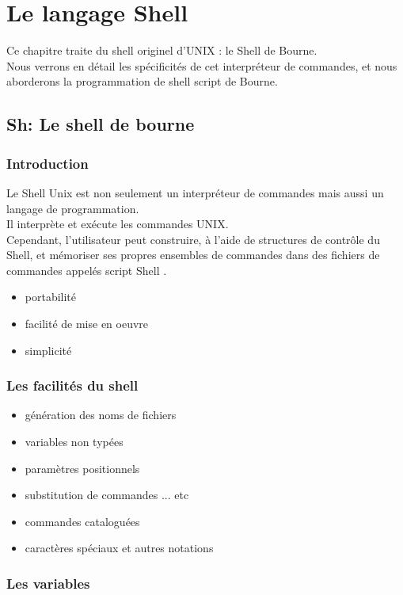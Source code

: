 \part{Le langage Shell}
	Ce chapitre traite du shell originel d'UNIX : le Shell de Bourne.\\
	Nous verrons en détail les spécificités de cet interpréteur de commandes, et nous aborderons la programmation de shell script de Bourne.
	\chapter{Sh: Le shell de bourne}
		\section{Introduction}
			Le Shell Unix est non seulement un interpréteur de commandes mais aussi un langage de programmation.\\
			Il interprète et exécute les commandes UNIX. \\
			Cependant, l'utilisateur peut construire, à l'aide de structures de contrôle du Shell, et mémoriser ses propres ensembles de commandes dans des fichiers de commandes appelés script Shell . \\
			\begin{itemize}
				\item portabilité
				\item facilité de mise en oeuvre
				\item simplicité
			\end{itemize}
		\section{Les facilités du shell}
			\begin{itemize}
				\item génération des noms de fichiers
				\item variables non typées 
				\item paramètres positionnels
				\item substitution de commandes ... etc
				\item commandes cataloguées
				\item caractères spéciaux et autres notations
			\end{itemize}
		\section{Les variables}
